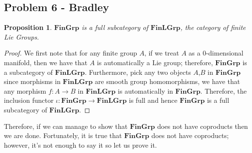 \documentclass{article}
\newtheorem{proposition}[subsection]{Proposition}
\begin{document}
\subsection{Problem 6 - Bradley}

\begin{proposition}
$\mathbf{FinGrp}$ is a full subcategory of $\mathbf{FinLGrp}$, the category of finite Lie Groups.
\end{proposition}
\begin{proof}
We first note that for any finite group $A$, if we treat $A$ as a $0$-dimensional manifold, then we have that $A$ is automatically a Lie group; therefore, $\mathbf{FinGrp}$ is a subcategory of $\mathbf{FinLGrp}$. Furthermore, pick any two objects $A$,$B$ in $\mathbf{FinGrp}$ since morphisms in $\mathbf{FinLGrp}$ are smooth group homomorphisms, we have that any morphism $f:A\to B$ in $\mathbf{FinLGrp}$ is automatically in $\mathbf{FinGrp}$. Therefore, the inclusion functor $\iota : \mathbf{FinGrp}\to \mathbf{FinLGrp}$ is full and hence $\mathbf{FinGrp}$ is a full subcategory of $\mathbf{FinLGrp}$.
\end{proof}
Therefore, if we can manage to show that $\mathbf{FinGrp}$ does not have coproducts then we are done. Fortunately, it is true that $\mathbf{FinGrp}$ does not have coproducts; however, it's not enough to say it so let us prove it.
\end{document}
